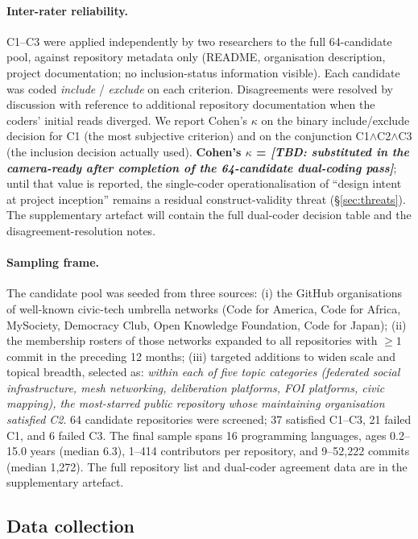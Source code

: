 \documentclass[a4paper,UKenglish,cleveref,autoref,thm-restate]{lipics-v2021}
\begin{document}
\paragraph{Inter-rater reliability.}
C1--C3 were applied independently by two researchers to the full 64-candidate pool, against repository metadata only (README, organisation description, project documentation; no inclusion-status information visible). Each candidate was coded \emph{include} / \emph{exclude} on each criterion. Disagreements were resolved by discussion with reference to additional repository documentation when the coders' initial reads diverged. We report Cohen's $\kappa$ on the binary include/exclude decision for C1 (the most subjective criterion) and on the conjunction C1$\wedge$C2$\wedge$C3 (the inclusion decision actually used). \textbf{Cohen's $\kappa$ = \textit{[TBD: substituted in the camera-ready after completion of the 64-candidate dual-coding pass]}}; until that value is reported, the single-coder operationalisation of ``design intent at project inception'' remains a residual construct-validity threat (\S\ref{sec:threats}). The supplementary artefact will contain the full dual-coder decision table and the disagreement-resolution notes.

\paragraph{Sampling frame.}
The candidate pool was seeded from three sources: (i) the GitHub organisations of well-known civic-tech umbrella networks (Code for America, Code for Africa, MySociety, Democracy Club, Open Knowledge Foundation, Code for Japan); (ii) the membership rosters of those networks expanded to all repositories with $\geq 1$ commit in the preceding 12 months; (iii) targeted additions to widen scale and topical breadth, selected as: \emph{within each of five topic categories (federated social infrastructure, mesh networking, deliberation platforms, FOI platforms, civic mapping), the most-starred public repository whose maintaining organisation satisfied C2}. 64 candidate repositories were screened; 37 satisfied C1--C3, 21 failed C1, and 6 failed C3. The final sample spans 16 programming languages, ages 0.2--15.0 years (median 6.3), 1--414 contributors per repository, and 9--52{,}222 commits (median 1{,}272). The full repository list and dual-coder agreement data are in the supplementary artefact.

\subsection{Data collection}\label{sec:collection}
\end{document}
